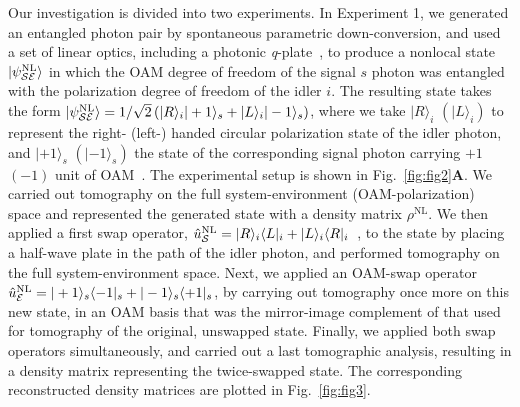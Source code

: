 \documentclass[12pt]{iopart}
\begin{document}
Our investigation is divided into two experiments. In Experiment 1, we generated an entangled photon pair by spontaneous parametric down-conversion, and used a set of linear optics, including a photonic \textit{q}-plate~\cite{marrucci:06}, to  produce a nonlocal state $|\psi_{\cal SE}^\mathrm{NL}\rangle$ in which the OAM degree of freedom of the signal $s$ photon was entangled with the polarization degree of freedom of the idler $i$. The resulting state takes the form $|\psi_{\cal SE}^\mathrm{NL}\rangle=1/\sqrt{2}\left(|R\rangle_i |+1\rangle_s + |L\rangle_i |-1\rangle_s\right)$, where we take $|R\rangle_i$ $\left(|L\rangle_i\right)$ to represent the right- (left-) handed circular polarization state of the idler photon, and $|+1\rangle_s$ $\left(|-1\rangle_s\right)$ the state of the corresponding signal photon carrying $+1$ $(-1)$ unit of OAM~\cite{karimi:10}. The experimental setup is shown in Fig.~\ref{fig:fig2}{\bf A}. We carried out tomography on the full system-environment (OAM-polarization) space and represented the generated state with a density matrix $\rho^\mathrm{NL}$. We then applied a first swap operator, $\hat{u}_{\cal S}^\mathrm{NL}=|R\rangle_i \langle L |_i + |L\rangle_i \langle R |_i$~{\cite{footnote4}}, to the state by placing a half-wave plate in the path of the idler photon, and performed tomography on the full system-environment space. Next, we applied an OAM-swap operator $\hat{u}_{\cal E}^\mathrm{NL}=|+1\rangle_s\langle -1 |_s + |-1\rangle_s \langle +1|_s$, by carrying out tomography once more on this new state, in an OAM basis that was the mirror-image complement of that used for tomography of the original, unswapped state. Finally, we applied both swap operators simultaneously, and carried out a last tomographic analysis, resulting in a density matrix representing the twice-swapped state. The corresponding reconstructed density matrices are plotted in Fig.~\ref{fig:fig3}.
\end{document}
